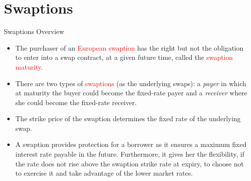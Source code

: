 \documentclass{beamer}
\begin{document}

\section{Swaptions}
\begin{frame}{Swaptions Overview}
\begin{itemize}
	\item<1-> The purchaser of an \textcolor{red}{European swaption} has the right but not the obligation to enter into a swap contract, at a given future time, called the \textcolor{red}{swaption maturity}.
	\item<2-> There are two types of \textcolor{red}{swaptions} (as the underlying swaps): a \emph{payer} in which at maturity the buyer could become the fixed-rate payer and a \emph{receiver} where she could become the fixed-rate receiver.
	\item <3-> The strike price of the swaption determines the fixed rate of the underlying swap.
	\item<4-> A swaption provides protection for a borrower as it ensures a maximum fixed interest rate payable in the future. Furthermore, it gives her the flexibility, if the rate does not rise above the swaption strike rate at expiry, to choose not to exercise it and take advantage of the lower market rates.
\end{itemize}
\end{frame}
\end{document}

